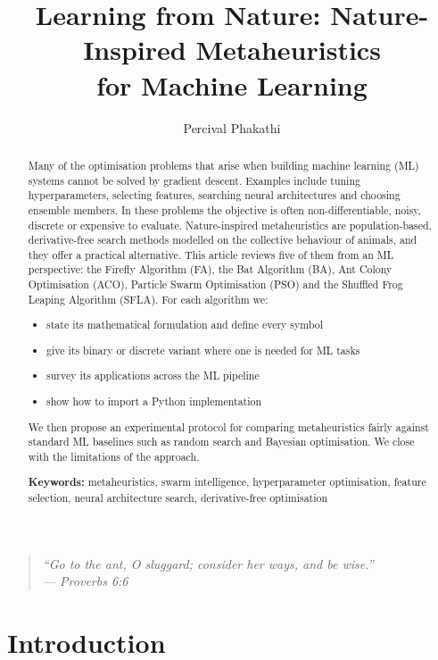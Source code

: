 \documentclass[11pt,a4paper]{article}
\title{Learning from Nature: Nature-Inspired Metaheuristics\\for Machine Learning}
\author{Percival Phakathi}
\date{}
\begin{document}
\maketitle

\begin{quote}
\centering\itshape
``Go to the ant, O sluggard; consider her ways, and be wise.''\\[0.25em]
\upshape --- Proverbs 6:6
\end{quote}

\begin{abstract}
\noindent Many of the optimisation problems that arise when building machine learning (ML) systems cannot be solved by gradient descent. Examples include tuning hyperparameters, selecting features, searching neural architectures and choosing ensemble members. In these problems the objective is often non-differentiable, noisy, discrete or expensive to evaluate. Nature-inspired metaheuristics are population-based, derivative-free search methods modelled on the collective behaviour of animals, and they offer a practical alternative. This article reviews five of them from an ML perspective: the Firefly Algorithm (FA), the Bat Algorithm (BA), Ant Colony Optimisation (ACO), Particle Swarm Optimisation (PSO) and the Shuffled Frog Leaping Algorithm (SFLA). For each algorithm we:
\begin{itemize}
  \item state its mathematical formulation and define every symbol
  \item give its binary or discrete variant where one is needed for ML tasks
  \item survey its applications across the ML pipeline
  \item show how to import a Python implementation
\end{itemize}
We then propose an experimental protocol for comparing metaheuristics fairly against standard ML baselines such as random search and Bayesian optimisation. We close with the limitations of the approach.

\medskip
\noindent\textbf{Keywords:} metaheuristics, swarm intelligence, hyperparameter optimisation, feature selection, neural architecture search, derivative-free optimisation
\end{abstract}

\section{Introduction}
\label{sec:intro}
\end{document}

